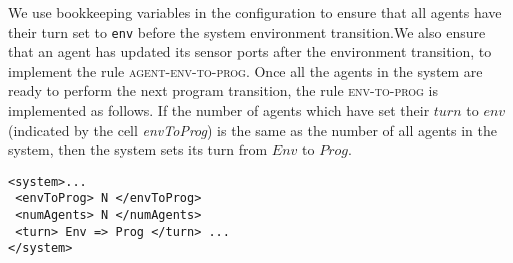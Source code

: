 We use bookkeeping variables in the \K configuration to ensure that all agents have their turn set to \texttt{env} before the system environment transition.We also  ensure that an agent has updated its sensor ports after the environment transition, to implement the rule \textsc{agent-env-to-prog}. Once all the agents in the system are ready to perform the next program transition, the rule \textsc{env-to-prog} is implemented as follows. If the number of agents which have set their $\mathit{turn}$ to $\mathit{env}$ (indicated by the cell {\em envToProg}) is the same as the number of all agents in the system, then the system sets its turn from $\mathit{Env}$ to $\mathit{Prog}$. 
\vspace{2pt}
\begin{mdframed}
\begin{Verbatim}[fontsize=\tiny]
<system>...
 <envToProg> N </envToProg>
 <numAgents> N </numAgents>  
 <turn> Env => Prog </turn> ... 
</system>                      
\end{Verbatim}
\end{mdframed}
